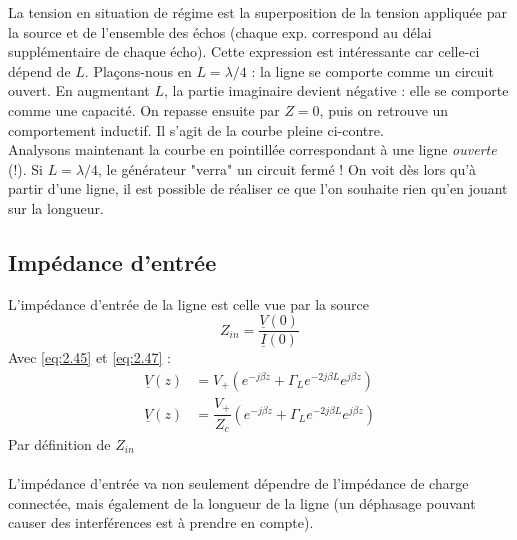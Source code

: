 	La tension en situation de régime est la superposition de la tension appliquée par la source et de 
	l'ensemble des échos (chaque exp. correspond au délai supplémentaire de chaque écho). Cette 
	expression est intéressante car celle-ci dépend de $L$. Plaçons-nous en $L=\lambda/4$ : la ligne 
	se comporte comme un circuit ouvert. En augmentant $L$, la partie imaginaire devient négative : 
	elle se comporte comme une capacité. On repasse ensuite par $Z=0$, puis on retrouve un comportement 
	inductif. Il s'agit de la courbe pleine ci-contre.\\
	Analysons maintenant la courbe en pointillée correspondant à une ligne \textit{ouverte} (!). Si 
	$L=\lambda/4$, le générateur "verra" un circuit fermé ! On voit dès lors qu'à partir d'une ligne, 
	il est possible de réaliser ce que l'on souhaite rien qu'en jouant sur la longueur.
	
	\subsection{Impédance d'entrée}
	L'impédance d'entrée de la ligne est celle vue par la source 
	\begin{equation}
	Z_{in} = \dfrac{\underline{V}(0)}{\underline{I}(0)}
	\end{equation}
	Avec \autoref{eq:2.45} et \autoref{eq:2.47} :
	\begin{equation}
	\begin{array}{ll}
	\underline{V}(z) &= V_+\left(e^{-j\beta z} + \Gamma_L e^{-2j\beta L}e^{j\beta z}\right)\\
	\underline{V}(z) &= \dfrac{V_+}{Z_c} \left(e^{-j\beta z} + \Gamma_L e^{-2j\beta L}e^{j\beta z}\right)	
	\end{array}
	\end{equation}
	Par définition de $Z_{in}$\\
	\ \\
	
	L'impédance d'entrée va non seulement dépendre de l'impédance de charge connectée, mais également de 
	la longueur de la ligne (un déphasage pouvant causer des interférences est à prendre en compte).
	
	
